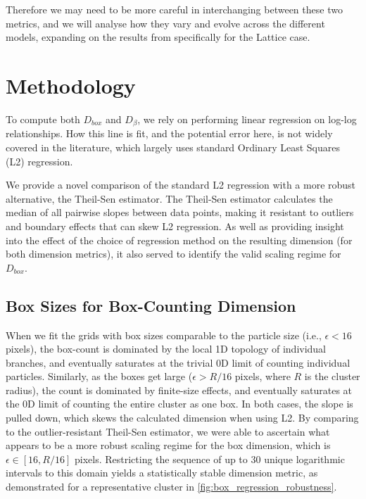 \documentclass[12pt, a4paper, oneside]{report}
\theoremstyle{remark}
\begin{document}
Therefore we may need to be more careful in interchanging between these two metrics, and we will analyse how they vary and evolve across the different models, expanding on the results from \cite{Grebenkov2017} specifically for the Lattice case.

\section{Methodology}
\label{sec:dim_method}
To compute both $D_{box}$ and $D_\beta$, we rely on performing linear regression on log-log relationships. How this line is fit, and the potential error here, is not widely covered in the literature, which largely uses standard Ordinary Least Squares (L2) regression.

We provide a novel comparison of the standard L2 regression with a more robust alternative, the Theil-Sen estimator. The Theil-Sen estimator calculates the median of all pairwise slopes between data points, making it resistant to outliers and boundary effects that can skew L2 regression. As well as providing insight into the effect of the choice of regression method on the resulting dimension (for both dimension metrics), it also served to identify the valid scaling regime for $D_{box}$.

\subsection{Box Sizes for Box-Counting Dimension}
When we fit the grids with box sizes comparable to the particle size (i.e., $\epsilon < 16$ pixels), the box-count is dominated by the local 1D topology of individual branches, and eventually saturates at the trivial 0D limit of counting individual particles. Similarly, as the boxes get large ($\epsilon > R/16$ pixels, where $R$ is the cluster radius), the count is dominated by finite-size effects, and eventually saturates at the 0D limit of counting the entire cluster as one box. In both cases, the slope is pulled down, which skews the calculated dimension when using L2. 
By comparing to the outlier-resistant Theil-Sen estimator,  we were able to ascertain what appears to be a more robust scaling regime for the box dimension, which is $\epsilon \in [16, R/16]$ pixels. 
Restricting the sequence of up to 30 unique logarithmic intervals to this domain yields a statistically stable dimension metric, as demonstrated for a representative cluster in \cref{fig:box_regression_robustness}.
\end{document}
